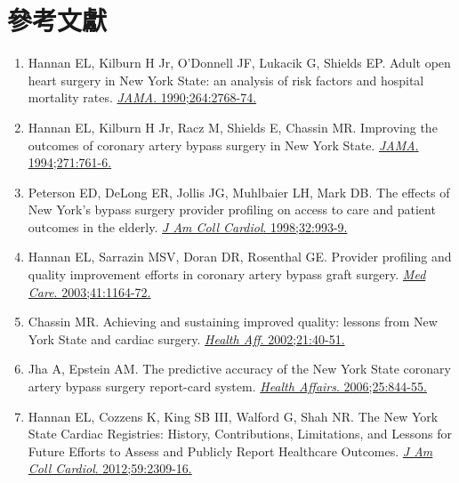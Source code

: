\documentclass[12pt,a4paper]{article}
\begin{document}
\section{參考文獻}

\begin{enumerate}
    \item Hannan EL, Kilburn H Jr, O'Donnell JF, Lukacik G, Shields EP. Adult open heart surgery in New York State: an analysis of risk factors and hospital mortality rates. \href{https://doi.org/10.1001/jama.1990.03450210068031}{\textit{JAMA}. 1990;264:2768-74.}

    \item Hannan EL, Kilburn H Jr, Racz M, Shields E, Chassin MR. Improving the outcomes of coronary artery bypass surgery in New York State. \href{https://doi.org/10.1001/jama.1994.03510300063033}{\textit{JAMA}. 1994;271:761-6.}

    \item Peterson ED, DeLong ER, Jollis JG, Muhlbaier LH, Mark DB. The effects of New York's bypass surgery provider profiling on access to care and patient outcomes in the elderly. \href{https://doi.org/10.1016/S0735-1097(98)00410-5}{\textit{J Am Coll Cardiol}. 1998;32:993-9.}

    \item Hannan EL, Sarrazin MSV, Doran DR, Rosenthal GE. Provider profiling and quality improvement efforts in coronary artery bypass graft surgery. \href{https://doi.org/10.1097/01.MLR.0000089344.07882.2E}{\textit{Med Care}. 2003;41:1164-72.}

    \item Chassin MR. Achieving and sustaining improved quality: lessons from New York State and cardiac surgery. \href{https://doi.org/10.1377/hlthaff.21.4.40}{\textit{Health Aff}. 2002;21:40-51.}

    \item Jha A, Epstein AM. The predictive accuracy of the New York State coronary artery bypass surgery report-card system. \href{https://doi.org/10.1377/hlthaff.25.3.844}{\textit{Health Affairs}. 2006;25:844-55.}

    \item Hannan EL, Cozzens K, King SB III, Walford G, Shah NR. The New York State Cardiac Registries: History, Contributions, Limitations, and Lessons for Future Efforts to Assess and Publicly Report Healthcare Outcomes. \href{https://doi.org/10.1016/j.jacc.2011.12.051}{\textit{J Am Coll Cardiol}. 2012;59:2309-16.}
\end{enumerate}
\end{document}

